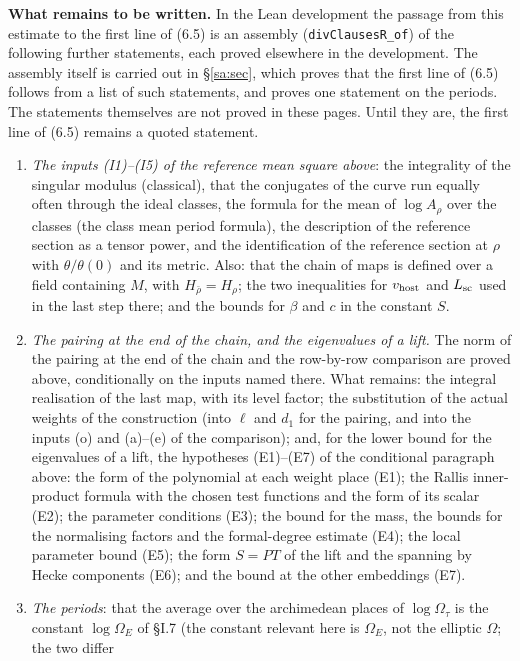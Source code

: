 \documentclass[11pt,letterpaper]{article}
\begin{document}
\textbf{What remains to be written.} In the Lean development the passage from this estimate to the first
line of (6.5) is an assembly (\texttt{divClausesR\_of}) of the following further statements, each proved
elsewhere in the development. The assembly itself is carried out in \S\ref{sa:sec}, which proves that the first line of (6.5) follows from a list of such statements, and proves one statement on the periods. The statements themselves are not proved in these pages. Until they are, the first line of (6.5) remains a quoted statement.
\begin{enumerate}[label=\textup{(\roman*)},leftmargin=2.4em]
\item \emph{The inputs \textup{(I1)--(I5)} of the reference mean square above}: the integrality of the singular modulus
(classical), that the conjugates of the curve run equally often through the ideal classes, the formula for
the mean of $\log A_\rho$ over the classes (the class mean period formula), the description of the
reference section as a tensor power, and the identification of the reference section at $\rho$ with
$\theta/\theta(0)$ and its metric. Also: that the chain of maps is defined over a field containing $M$, with
$H_{\bar\rho}=H_\rho$; the two inequalities for $v_{\rm host}$ and $L_{\rm sc}$ used in the last step
there; and the bounds for $\beta$ and $c$ in the
constant $S$.
\item \emph{The pairing at the end of the chain, and the eigenvalues of a lift.} The norm of the pairing at
the end of the chain and the row-by-row comparison are proved above, conditionally on the inputs named
there. What remains: the integral realisation of the last map, with its level factor; the substitution of
the actual weights of the construction (into $\ell$ and $d_1$ for the pairing, and into the inputs (o) and (a)--(e)
of the comparison); and, for the lower bound for the eigenvalues of a lift, the hypotheses (E1)--(E7) of the conditional
paragraph above: the form of the polynomial at each weight place (E1); the Rallis inner-product formula
with the chosen test functions and the form of its scalar (E2); the parameter conditions (E3); the bound
for the mass, the bounds for the normalising factors and the formal-degree estimate (E4); the local
parameter bound (E5); the form $S=PT$ of the lift and the spanning by Hecke components (E6); and the bound
at the other embeddings (E7).
\item \emph{The periods}: that the average over the archimedean places of $\log\Omega_\tau$ is the constant
$\log\Omega_E$ of \S I.7 (the constant relevant here is $\Omega_E$, not the elliptic $\Omega$; the two differ

\end{enumerate}
\end{document}
